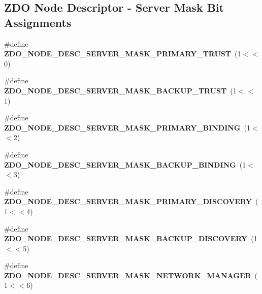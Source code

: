 \subsection*{Z\+DO Node Descriptor -\/ Server Mask Bit Assignments}
\begin{DoxyCompactItemize}
\item 
\mbox{\label{group__zdo_ga047221deea621025ac8dcaaf1f2338f2}} 
\#define {\bfseries Z\+D\+O\+\_\+\+N\+O\+D\+E\+\_\+\+D\+E\+S\+C\+\_\+\+S\+E\+R\+V\+E\+R\+\_\+\+M\+A\+S\+K\+\_\+\+P\+R\+I\+M\+A\+R\+Y\+\_\+\+T\+R\+U\+ST}~(1$<$$<$0)
\item 
\mbox{\label{group__zdo_gade4cff93e5bb2144c457b5cd2662901f}} 
\#define {\bfseries Z\+D\+O\+\_\+\+N\+O\+D\+E\+\_\+\+D\+E\+S\+C\+\_\+\+S\+E\+R\+V\+E\+R\+\_\+\+M\+A\+S\+K\+\_\+\+B\+A\+C\+K\+U\+P\+\_\+\+T\+R\+U\+ST}~(1$<$$<$1)
\item 
\mbox{\label{group__zdo_gab02988bb51ab342541de959b6817548b}} 
\#define {\bfseries Z\+D\+O\+\_\+\+N\+O\+D\+E\+\_\+\+D\+E\+S\+C\+\_\+\+S\+E\+R\+V\+E\+R\+\_\+\+M\+A\+S\+K\+\_\+\+P\+R\+I\+M\+A\+R\+Y\+\_\+\+B\+I\+N\+D\+I\+NG}~(1$<$$<$2)
\item 
\mbox{\label{group__zdo_ga8c4d4bd7c4408c9490f946812ba19fa4}} 
\#define {\bfseries Z\+D\+O\+\_\+\+N\+O\+D\+E\+\_\+\+D\+E\+S\+C\+\_\+\+S\+E\+R\+V\+E\+R\+\_\+\+M\+A\+S\+K\+\_\+\+B\+A\+C\+K\+U\+P\+\_\+\+B\+I\+N\+D\+I\+NG}~(1$<$$<$3)
\item 
\mbox{\label{group__zdo_gad76fcdfacf026313325c23ac2160f698}} 
\#define {\bfseries Z\+D\+O\+\_\+\+N\+O\+D\+E\+\_\+\+D\+E\+S\+C\+\_\+\+S\+E\+R\+V\+E\+R\+\_\+\+M\+A\+S\+K\+\_\+\+P\+R\+I\+M\+A\+R\+Y\+\_\+\+D\+I\+S\+C\+O\+V\+E\+RY}~(1$<$$<$4)
\item 
\mbox{\label{group__zdo_ga2369288296faf5931decd53d0822acc7}} 
\#define {\bfseries Z\+D\+O\+\_\+\+N\+O\+D\+E\+\_\+\+D\+E\+S\+C\+\_\+\+S\+E\+R\+V\+E\+R\+\_\+\+M\+A\+S\+K\+\_\+\+B\+A\+C\+K\+U\+P\+\_\+\+D\+I\+S\+C\+O\+V\+E\+RY}~(1$<$$<$5)
\item 
\mbox{\label{group__zdo_ga44008802d01c87ad30c906829a799737}} 
\#define {\bfseries Z\+D\+O\+\_\+\+N\+O\+D\+E\+\_\+\+D\+E\+S\+C\+\_\+\+S\+E\+R\+V\+E\+R\+\_\+\+M\+A\+S\+K\+\_\+\+N\+E\+T\+W\+O\+R\+K\+\_\+\+M\+A\+N\+A\+G\+ER}~(1$<$$<$6)
\end{DoxyCompactItemize}
